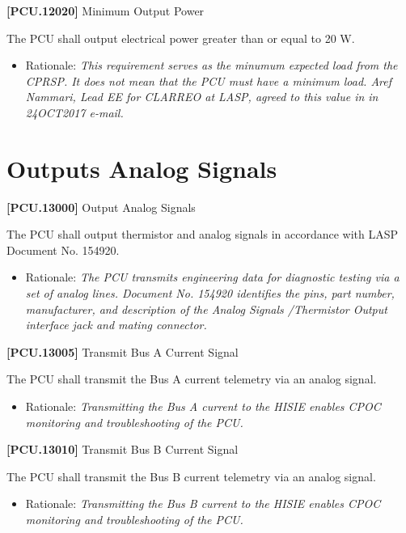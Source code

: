 \documentclass[12pt,oneside,oldfontcommands]{memoir}
\begin{document}
\textbf{[PCU.12020]} Minimum Output Power

The \gls{PCU} shall output electrical power greater than or equal to 20 W.

\begin{itemize}
\item{} Rationale: \emph{This requirement serves as the minumum expected load from the CPRSP. It does not mean that the PCU must have a minimum load. Aref Nammari, Lead EE for CLARREO at LASP, agreed to this value in in 24OCT2017 e-mail.}

\end{itemize}

\section{Outputs Analog Signals}
\label{outputsanalogsignals}

\textbf{[PCU.13000]} Output Analog Signals

The \gls{PCU} shall output thermistor and analog signals in accordance with \gls{LASP} Document No. 154920.

\begin{itemize}
\item{} Rationale: \emph{The PCU transmits engineering data for diagnostic testing via a set of analog lines. Document No. 154920 identifies the pins, part number, manufacturer, and description of the Analog Signals \slash  Thermistor Output interface jack and mating connector.}

\end{itemize}

\textbf{[PCU.13005]} Transmit Bus A Current Signal

The \gls{PCU} shall transmit the Bus A current telemetry via an analog signal.

\begin{itemize}
\item{} Rationale: \emph{Transmitting the Bus A current to the HISIE enables CPOC monitoring and troubleshooting of the PCU.}

\end{itemize}

\textbf{[PCU.13010]} Transmit Bus B Current Signal

The \gls{PCU} shall transmit the Bus B current telemetry via an analog signal.

\begin{itemize}
\item{} Rationale: \emph{Transmitting the Bus B current to the HISIE enables CPOC monitoring and troubleshooting of the PCU.}

\end{itemize}
\end{document}
